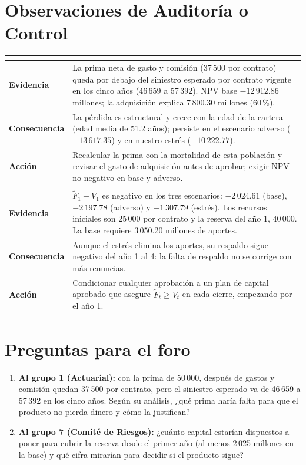 \documentclass[11pt,a4paper]{article}
\begin{document}
\section*{Observaciones de Auditoría o Control}
\small
\begin{tabularx}{\textwidth}{@{}>{\bfseries}p{2.4cm}X@{}}
\toprule
\multicolumn{2}{@{}l}{\normalsize\textbf{1. La tarifa no cubre el siniestro esperado en ningún año}}\\
\midrule
Evidencia & La prima neta de gasto y comisión (37\,500 por contrato) queda por debajo del siniestro
esperado por contrato vigente en los cinco años (46\,659 a 57\,392). NPV base $-12\,912.86$
millones; la adquisición explica 7\,800.30 millones (60\,\%).\\
Consecuencia & La pérdida es estructural y crece con la edad de la cartera (edad media de 51.2
años); persiste en el escenario adverso ($-13\,617.35$) y en nuestro estrés ($-10\,222.77$).\\
Acción & Recalcular la prima con la mortalidad de esta población y revisar el gasto de adquisición
antes de aprobar; exigir NPV no negativo en base y adverso.\\
\midrule
\multicolumn{2}{@{}l}{\normalsize\textbf{2. Los recursos no respaldan la reserva desde el primer cierre}}\\
\midrule
Evidencia & $\tilde F_1 - V_1$ es negativo en los tres escenarios: $-2\,024.61$ (base),
$-2\,197.78$ (adverso) y $-1\,307.79$ (estrés). Los recursos iniciales son 25\,000 por contrato y la
reserva del año 1, 40\,000. La base requiere 3\,050.20 millones de aportes.\\
Consecuencia & Aunque el estrés elimina los aportes, su respaldo sigue negativo del año 1 al 4: la
falta de respaldo no se corrige con más renuncias.\\
Acción & Condicionar cualquier aprobación a un plan de capital aprobado que asegure
$\tilde F_t \ge V_t$ en cada cierre, empezando por el año 1.\\
\bottomrule
\end{tabularx}
\normalsize

\section*{Preguntas para el foro}
\begin{enumerate}[label=\arabic*.]
\item \textbf{Al grupo 1 (Actuarial):} con la prima de 50\,000, después de gastos y comisión quedan
37\,500 por contrato, pero el siniestro esperado va de 46\,659 a 57\,392 en los cinco años. Según su
análisis, ¿qué prima haría falta para que el producto no pierda dinero y cómo la justifican?
\item \textbf{Al grupo 7 (Comité de Riesgos):} ¿cuánto capital estarían dispuestos a poner para
cubrir la reserva desde el primer año (al menos 2\,025 millones en la base) y qué cifra mirarían
para decidir si el producto sigue?
\end{enumerate}
\end{document}
